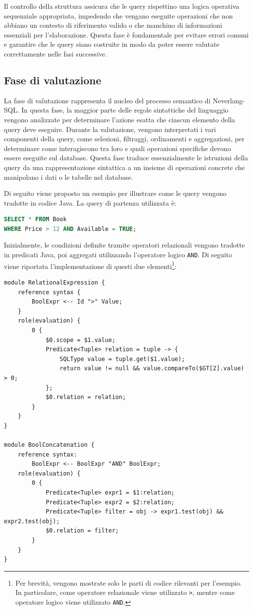 \documentclass[12pt,a4paper,openright,twoside]{book}
\begin{document}
Il controllo della struttura assicura che le query rispettino una logica operativa sequenziale appropriata, impedendo che vengano eseguite 
operazioni che non abbiano un contesto di riferimento valido o che manchino di informazioni essenziali per l’elaborazione. Questa fase è 
fondamentale per evitare errori comuni e garantire che le query siano costruite in modo da poter essere valutate correttamente nelle fasi 
successive.

\subsection{Fase di valutazione}
La fase di valutazione rappresenta il nucleo del processo semantico di Neverlang-SQL. In questa fase, la maggior parte delle regole 
sintattiche del linguaggio vengono analizzate per determinare l’azione esatta che ciascun elemento della query deve eseguire. Durante la 
valutazione, vengono interpretati i vari componenti della query, come selezioni, filtraggi, ordinamenti e aggregazioni, per determinare come 
interagiscono tra loro e quali operazioni specifiche devono essere eseguite sul database. Questa fase traduce essenzialmente le istruzioni 
della query da una rappresentazione sintattica a un insieme di operazioni concrete che manipolano i dati o le tabelle nel database.

Di seguito viene proposto un esempio per illustrare come le query vengono tradotte in codice Java. La query di partenza utilizzata è:
\begin{lstlisting}[language=SQL]
SELECT * FROM Book
WHERE Price > 12 AND Available = TRUE;
\end{lstlisting}
Inizialmente, le condizioni definite tramite operatori relazionali vengono tradotte in predicati Java, poi aggregati utilizzando l’operatore 
logico \texttt{AND}. Di seguito viene riportata l’implementazione di questi due elementi\footnote{Per brevità, vengono mostrate solo le parti 
di codice rilevanti per l’esempio. In particolare, come operatore relazionale viene utilizzato \texttt{>}, mentre come operatore logico viene 
utilizzato \texttt{AND}.}:
\begin{lstlisting}[language=Neverlang]
module RelationalExpression {
    reference syntax {
        BoolExpr <-- Id ">" Value;
    }
    role(evaluation) {
        0 {
            $0.scope = $1.value;
            Predicate<Tuple> relation = tuple -> {
                SQLType value = tuple.get($1.value);
                return value != null && value.compareTo($GT[2].value) > 0;
            };
            $0.relation = relation;
        }
    }
}

module BoolConcatenation {
    reference syntax:
        BoolExpr <-- BoolExpr "AND" BoolExpr;
    role(evaluation) {
        0 {
            Predicate<Tuple> expr1 = $1:relation;
            Predicate<Tuple> expr2 = $2:relation;
            Predicate<Tuple> filter = obj -> expr1.test(obj) && expr2.test(obj);
            $0.relation = filter;
        }
    }
}
\end{lstlisting}
\end{document}
